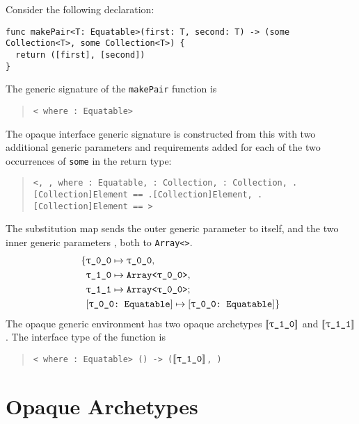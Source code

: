\documentclass[../generics]{subfiles}
\begin{document}
\begin{example}
Consider the following declaration:
\begin{Verbatim}
func makePair<T: Equatable>(first: T, second: T) -> (some Collection<T>, some Collection<T>) {
  return ([first], [second])
}
\end{Verbatim}
The generic signature of the \texttt{makePair} function is
\begin{quote}
\texttt{< where :\ Equatable>}
\end{quote}

The opaque interface generic signature is constructed from this with two additional generic parameters and requirements added for each of the two occurrences of \texttt{some} in the return type:
\begin{quote}
\texttt{<, ,  where :\ Equatable, :\ Collection, :\ Collection, .[Collection]Element == .[Collection]Element, .[Collection]Element == >}
\end{quote}

The substitution map sends the outer generic parameter  to itself, and the two inner generic parameters ,  both to \texttt{Array<>}.
\begin{align*}
\SubstMapC{
&\SubstType{\ttgp{0}{0}}{\ttgp{0}{0}},\\
&\SubstType{\ttgp{1}{0}}{Array<\ttgp{0}{0}>},\\
&\SubstType{\ttgp{1}{1}}{Array<\ttgp{0}{0}>}
}{\\
&\SubstConf{\ttgp{0}{0}}{\ttgp{0}{0}}{Equatable}
}
\end{align*}
The opaque generic environment has two opaque archetypes $\archetype{\ttgp{1}{0}}$ and $\archetype{\ttgp{1}{1}}$. The interface type of the function is
\begin{quote}
\texttt{< where :\ Equatable> () -> ($\archetype{\ttgp{1}{0}}$, )}
\end{quote}
\end{example}

\fi

\section[]{Opaque Archetypes}\label{opaquearchetype}

\ifWIP
\end{document}
